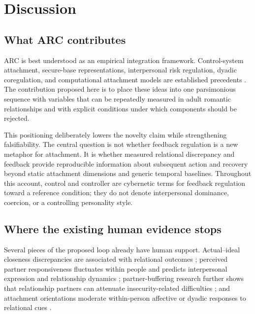 \section{Discussion}

\subsection{What ARC contributes}

ARC is best understood as an empirical integration framework. Control-system attachment, secure-base representations, interpersonal risk regulation, dyadic coregulation, and computational attachment models are established precedents \parencite{bowlby1982attachment,kobak1993control,murray2006risk,sbarra2008coregulation,petters2019control,gagliardi2022control,stevens2009dynamic}. The contribution proposed here is to place these ideas into one parsimonious sequence with variables that can be repeatedly measured in adult romantic relationships and with explicit conditions under which components should be rejected.

This positioning deliberately lowers the novelty claim while strengthening falsifiability. The central question is not whether feedback regulation is a new metaphor for attachment. It is whether measured relational discrepancy and feedback provide reproducible information about subsequent action and recovery beyond static attachment dimensions and generic temporal baselines. Throughout this account, control and controller are cybernetic terms for feedback regulation toward a reference condition; they do not denote interpersonal dominance, coercion, or a controlling personality style.

\subsection{Where the existing human evidence stops}

Several pieces of the proposed loop already have human support. Actual--ideal closeness discrepancies are associated with relational outcomes \parencite{frost2013closeness,pusch2022closeness,pietras2024closeness}; perceived partner responsiveness fluctuates within people and predicts interpersonal expression and relationship dynamics \parencite{ruan2020responsiveness,segal2016responsiveness}; partner-buffering research further shows that relationship partners can attenuate insecurity-related difficulties \parencite{simpson2014buffering,overall2022buffering}; and attachment orientations moderate within-person affective or dyadic responses to relational cues \parencite{sadikaj2011dynamics,beck2024daily,xie2025interdependence,carnelley2025phubbing}.

